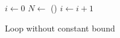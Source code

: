 \begin{figure}
    \begin{algorithmic}
        \State $i \gets 0$
        \State $N \gets$ () 
        \State {}
        \State $i \gets i + 1$
        \EndWhile
    \end{algorithmic}
    \caption{Loop without constant bound}
    \label{fig:intro:unroll-nostatic-bound}
\end{figure}
